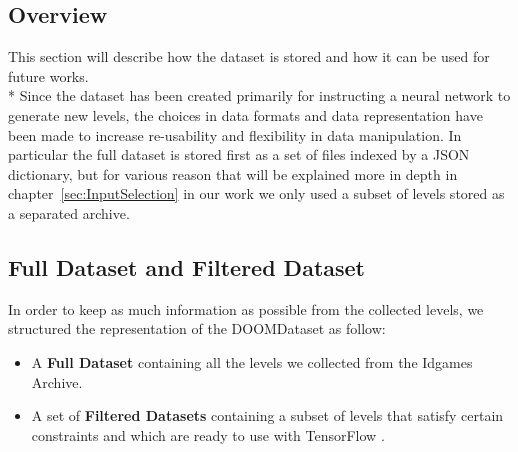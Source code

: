 \subsection{Overview}
This section will describe how the dataset is stored and how it can be used for future works. \\* 
Since the dataset has been created primarily for instructing a neural network to generate new levels, the choices in data formats and data representation have been made to increase re-usability and flexibility in data manipulation. In particular the full dataset is stored first as a set of files indexed by a JSON dictionary, but for various reason that will be explained more in depth in  chapter~\ref{sec:InputSelection} in our work we only used a subset of levels stored as a separated archive.
\subsection{Full Dataset and Filtered Dataset}
In order to keep as much information as possible from the collected levels, we structured the representation of the DOOMDataset as follow:
\begin{itemize}
	\item  A \textbf{Full Dataset} containing all the levels we collected from the Idgames Archive.
	\item A set of \textbf{Filtered Datasets} containing a subset of levels that satisfy certain constraints and which are ready to use with TensorFlow \cite{tensorflow2015-whitepaper}.
\end{itemize}
